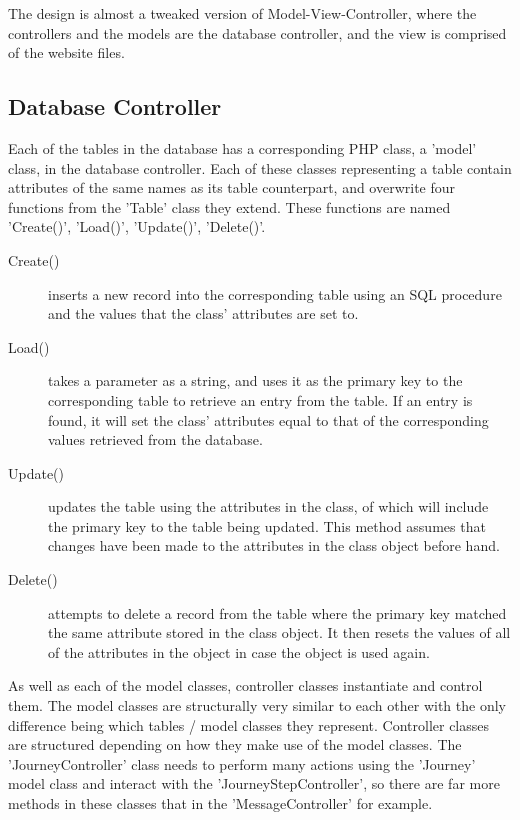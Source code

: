 \documentclass[11pt]{article}
\begin{document}
The design is almost a tweaked version of Model-View-Controller, where the controllers and the models are the database controller, and the view is comprised of the website files.

\subsection{Database Controller}
Each of the tables in the database has a corresponding PHP class, a 'model' class, in the database controller. Each of these classes representing a table contain attributes of the same names as its table counterpart, and overwrite four functions from the 'Table' class they extend. These functions are named 'Create()', 'Load()', 'Update()', 'Delete()'. 

\begin{description}
\item[Create()] inserts a new record into the corresponding table using an SQL procedure and the values that the class' attributes are set to.

\item[Load()] takes a parameter as a string, and uses it as the primary key to the corresponding table to retrieve an entry from the table. If an entry is found, it will set the class' attributes equal to that of the corresponding values retrieved from the database.

\item[Update()] updates the table using the attributes in the class, of which will include the primary key to the table being updated. This method assumes that changes have been made to the attributes in the class object before hand.

\item[Delete()] attempts to delete a record from the table where the primary key matched the same attribute stored in the class object. It then resets the values of all of the attributes in the object in case the object is used again.
 
\end{description}


As well as each of the model classes, controller classes instantiate and control them. The model classes are structurally very similar to each other with the only difference being which tables / model classes they represent. Controller classes are structured depending on how they make use of the model classes. The 'Journey\textunderscore Controller' class needs to perform many actions using the 'Journey' model class and interact with the 'Journey\textunderscore Step\textunderscore Controller', so there are far more methods in these classes that in the 'Message\textunderscore Controller' for example.
\end{document}

